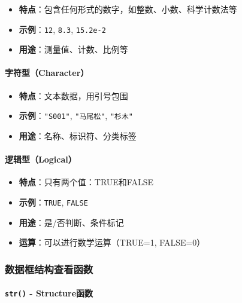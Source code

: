\documentclass[
  twoside]{book}
\providecommand{\tightlist}{%
  \setlength{\itemsep}{0pt}\setlength{\parskip}{0pt}}
\begin{document}
\begin{itemize}
\tightlist
\item
  \textbf{特点}：包含任何形式的数字，如整数、小数、科学计数法等
\item
  \textbf{示例}：\texttt{12}, \texttt{8.3}, \texttt{15.2e-2}
\item
  \textbf{用途}：测量值、计数、比例等
\end{itemize}

\hypertarget{ux5b57ux7b26ux578bcharacter}{%
\paragraph{字符型（Character）}\label{ux5b57ux7b26ux578bcharacter}}

\begin{itemize}
\tightlist
\item
  \textbf{特点}：文本数据，用引号包围
\item
  \textbf{示例}：\texttt{"S001"}, \texttt{"马尾松"}, \texttt{"杉木"}
\item
  \textbf{用途}：名称、标识符、分类标签
\end{itemize}

\hypertarget{ux903bux8f91ux578blogical}{%
\paragraph{逻辑型（Logical）}\label{ux903bux8f91ux578blogical}}

\begin{itemize}
\tightlist
\item
  \textbf{特点}：只有两个值：TRUE和FALSE
\item
  \textbf{示例}：\texttt{TRUE}, \texttt{FALSE}
\item
  \textbf{用途}：是/否判断、条件标记
\item
  \textbf{运算}：可以进行数学运算（TRUE=1, FALSE=0）
\end{itemize}

\hypertarget{ux6570ux636eux6846ux7ed3ux6784ux67e5ux770bux51fdux6570}{%
\subsubsection{数据框结构查看函数}\label{ux6570ux636eux6846ux7ed3ux6784ux67e5ux770bux51fdux6570}}

\hypertarget{str---structureux51fdux6570}{%
\paragraph{\texorpdfstring{\texttt{str()} - Structure函数}{str() - Structure函数}}\label{str---structureux51fdux6570}}
\end{document}
